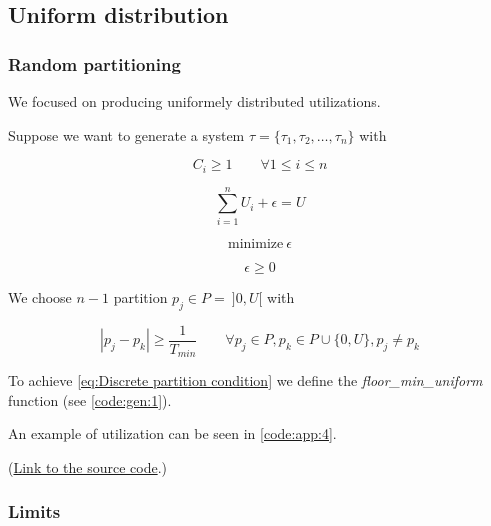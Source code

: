 \subsection{Uniform distribution}

\subsubsection{Random partitioning}

We focused on producing uniformely distributed utilizations.

Suppose we want to generate a system $\tau = \{\tau_1 , \tau_2 , \dots , \tau_n \}$ with

\begin{equation}
	C_i \geq 1 \qquad \forall 1 \leq i \leq n
	\label{eq:WCET minimum}
\end{equation}

\begin{equation}
	\sum_{i=1}^{n} U_i + \epsilon = U
	\label{eq:Usage shift}
\end{equation}

\begin{equation}
	\text{minimize}~\epsilon
	\label{eq:Economic function of the generator}
\end{equation}

\begin{equation}
	\epsilon \geq 0
	\label{eq:Usage shift polarity}
\end{equation}

We choose $n-1$ partition $p_j \in P = ~]0, U[$ with

\begin{equation}
	|p_j - p_k| \geq \frac{1}{T_{min}} \qquad \forall p_j \in P, p_k \in P \cup \{0, U\}, p_j \neq p_k
	\label{eq:Discrete partition condition}
\end{equation}

To achieve \ref{eq:Discrete partition condition} we define the \emph{floor\_min\_uniform} function (see \ref{code:gen:1}).


An example of utilization can be seen in \ref{code:app:4}.

(\href{../h/os/generator.h}{Link to the source code}.)

\subsubsection{Limits}

